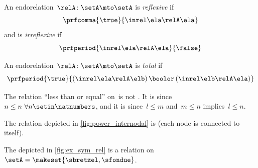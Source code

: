 \begin{ctdefinition}
    \label{def:endo_reflexive_irreflexive}
    \label{def:reflexive-relation}
    \label{def:irreflexive-relation}
    An endorelation~$\relA\colon \setA\mto \setA$ is \emph{reflexive} if
    \begin{equation}\label{eq:reflexive}
        \prfcomma{
            \true
        }{
            \inrel \ela \relA \ela
        }
    \end{equation}
    and is \emph{irreflexive} if
    \begin{equation}\label{eq:irreflexive}
        \prfperiod{
            \inrel \ela \relA \ela
        }{
            \false
        }
    \end{equation}
\end{ctdefinition}

\begin{ctdefinition}[Total]
    \label{def:total-relation}
    An endorelation~$\relA\colon \setA\mto \setA$ is \emph{total} if
    \begin{equation}\label{eq:total}
        \prfperiod{
            \true
        }{
            (\inrel\ela\relA\elb )\,\boolor\, (\inrel\elb\relA\ela)
        }
    \end{equation}
\end{ctdefinition}

\begin{example}
    The relation ``less than or equal'' on~\natnumbers is not .
    It is  since~$n\leq n \ \forall n\setin \natnumbers$, and it is  since~$l\leq m$ and~$m\leq n$ implies~$l\leq n$.
\end{example}

\begin{example}
    The relation depicted in \cref{fig:power_internodal} is  (each node is connected to itself).
\end{example}
\begin{marginfigure}
    \centering
    \caption{Example of  endorelation.}
    \label{fig:ex_sym_rel}
\end{marginfigure}
\begin{example}
    The  depicted in \cref{fig:ex_sym_rel} is a  relation on~$\setA=\makeset{\sbretzel,\sfondue}$.
\end{example}

